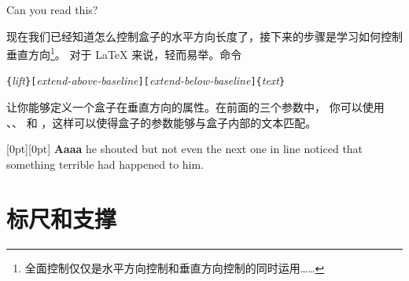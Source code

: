 \begin{example}
\par
{}\par
{} \par
{} \par
{}
Can you read this?
\end{example}

现在我们已经知道怎么控制盒子的水平方向长度了，接下来的步骤是学习如何控制
垂直方向\footnote{全面控制仅仅是水平方向控制和垂直方向控制的同时运用……}。
对于 \LaTeX{} 来说，轻而易举。命令

\begin{lscommand}
\verb|{|\emph{lift}\verb|}[|\emph{extend-above-baseline}\verb|][|\emph{extend-below-baseline}\verb|]{|\emph{text}\verb|}|
\end{lscommand}

\noindent 让你能够定义一个盒子在垂直方向的属性。在前面的三个参数中，
你可以使用 、、 
和 ，这样可以使得盒子的参数能够与盒子内部的文本匹配。

\begin{example}
\raisebox{0pt}[0pt][0pt]{\Large%
\textbf{Aaaa\raisebox{-0.3ex}{a}%
\raisebox{-0.7ex}{aa}%
\raisebox{-1.2ex}{r}%
\raisebox{-2.2ex}{g}%
\raisebox{-4.5ex}{h}}}
he shouted but not even the next
one in line noticed that something
terrible had happened to him.
\end{example}


\section{标尺和支撑}
\label{sec:rule}

